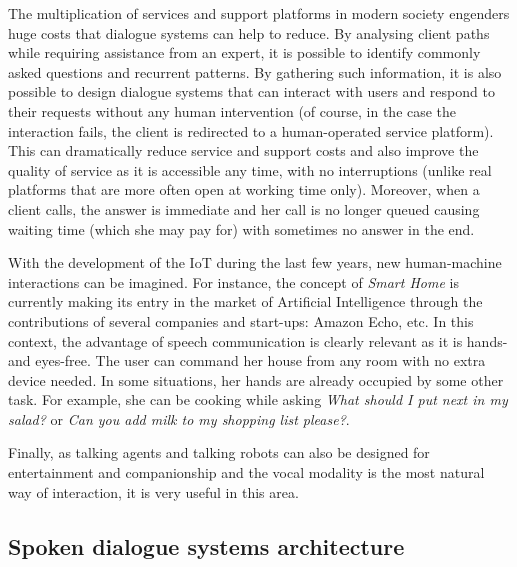         The multiplication of services and support platforms in modern society engenders huge costs that dialogue systems can help to reduce. By analysing client paths while requiring assistance from an expert, it is possible to identify commonly asked questions and recurrent patterns. By gathering such information, it is also possible to design dialogue systems that can interact with users and respond to their requests without any human intervention (of course, in the case the interaction fails, the client is redirected to a human-operated service platform). This can dramatically reduce service and support costs and also improve the quality of service as it is accessible any time, with no interruptions (unlike real platforms that are more often open at working time only). Moreover, when a client calls, the answer is immediate and her call is no longer queued causing waiting time (which she may pay for) with sometimes no answer in the end.

        With the development of the IoT during the last few years, new human-machine interactions can be imagined. For instance, the concept of \textit{Smart Home} is currently making its entry in the market of Artificial Intelligence through the contributions of several companies and start-ups: Amazon Echo, etc. In this context, the advantage of speech communication is clearly relevant as it is hands- and eyes-free. The user can command her house from any room with no extra device needed. In some situations, her hands are already occupied by some other task. For example, she can be cooking \cite{Laroche2013} while asking \textit{What should I put next in my salad?} or \textit{Can you add milk to my shopping list please?}.

        Finally, as talking agents and talking robots can also be designed for entertainment and companionship \cite{Gelin2010,Sidner2013} and the vocal modality is the most natural way of interaction, it is very useful in this area.
        
        \subsection{Spoken dialogue systems architecture}
        \label{soa:architecture}

